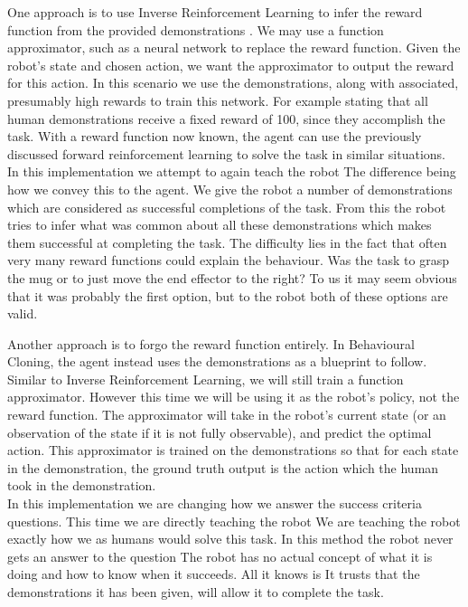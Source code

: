 One approach is to use Inverse Reinforcement Learning to infer the reward function from the provided demonstrations \cite{inverse-rl}. We may use a function approximator, such as a neural network to replace the reward function. Given the robot's state and chosen action, we want the approximator to output the reward for this action. In this scenario we use the demonstrations, along with associated, presumably high rewards to train this network. For example stating that all human demonstrations receive a fixed reward of 100, since they accomplish the task. With a reward function now known, the agent can use the previously discussed forward reinforcement learning to solve the task in similar situations.\\
In this implementation we attempt to again teach the robot  The difference being how we convey this to the agent. We give the robot a number of demonstrations which are considered as successful completions of the task. From this the robot tries to infer what was common about all these demonstrations which makes them successful at completing the task. The difficulty lies in the fact that often very many reward functions could explain the behaviour. Was the task to grasp the mug or to just move the end effector to the right? To us it may seem obvious that it was probably the first option, but to the robot both of these options are valid.

Another approach is to forgo the reward function entirely. In Behavioural Cloning, the agent instead uses the demonstrations as a blueprint to follow. Similar to Inverse Reinforcement Learning, we will still train a function approximator. However this time we will be using it as the robot's policy, not the reward function. The approximator will take in the robot's current state (or an observation of the state if it is not fully observable), and predict the optimal action. This approximator is trained on the demonstrations so that for each state in the demonstration, the ground truth output is the action which the human took in the demonstration. \\
In this implementation we are changing how we answer the success criteria questions. This time we are directly teaching the robot  We are teaching the robot exactly how we as humans would solve this task. In this method the robot never gets an answer to the question  The robot has no actual concept of what it is doing and how to know when it succeeds. All it knows is  It trusts that the demonstrations it has been given, will allow it to complete the task.


